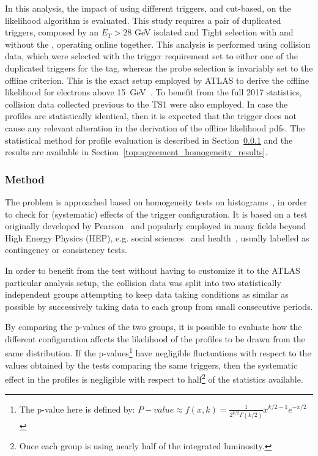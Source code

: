 In this 
analysis, the impact of using different triggers, \rnn{} and cut-based, on the likelihood algorithm is evaluated. This study requires a pair of duplicated triggers, composed by an $E_T > 28$ GeV isolated and Tight selection with and without the \rnn{}, operating online together. 
This analysis is performed using \Zee{} \tnp{} collision data, which were selected with the trigger requirement set to either one of the duplicated triggers for the tag, whereas the probe selection is invariably set to the offline \vloose{} criterion. This is the exact setup employed by ATLAS to derive the offline likelihood for electrons above \SI{15}{\GeV}~\cite{aaboud2019electron}. To benefit from the full 2017 statistics, collision data collected previous to the TS1 were also employed. In case the profiles are statistically identical, then it is expected that the \rnn{} trigger does not cause any relevant alteration in the derivation of the offline likelihood pdfs.  The statistical method for profile evaluation is described in Section~\ref{top:homogeneity_method} and the results are available in Section~\ref{top:agreement_homogeneity_results}.




\subsubsection{Method}\label{top:homogeneity_method}



The problem is approached based on homogeneity tests on histograms~\cite{homogeneity_test}, in order to check for (systematic) effects of the trigger configuration. It is based on a test originally developed by Pearson~\cite{pearson1911probability} and popularly employed in many fields beyond High Energy Physics (HEP), e.g. social sciences~\cite{wickens2014multiway} and health~\cite{ma2015homogeneity}, usually labelled as contingency or consistency tests.

In order to benefit from the test without having to customize it to the ATLAS particular analysis setup, the collision data was split into two
statistically independent groups attempting to keep data taking conditions as
similar as possible by successively taking data to each group from small
consecutive periods. 

By comparing the p-values of the two groups, it is possible to evaluate how the different configuration affects the likelihood of the profiles to be drawn from the same distribution. If the p-values\footnote{The p-value here is defined by: $P-value \approx f(x, k) = \frac{1}{2^{k/2}\Gamma(k/2)}x^{k/2 -1}e^{-x/2}$} have negligible fluctuations with respect to the values obtained by the tests comparing the same triggers, then the systematic effect in the profiles is negligible with respect to half\footnote{Once each group is using nearly half of the integrated luminosity.} of the statistics available.



